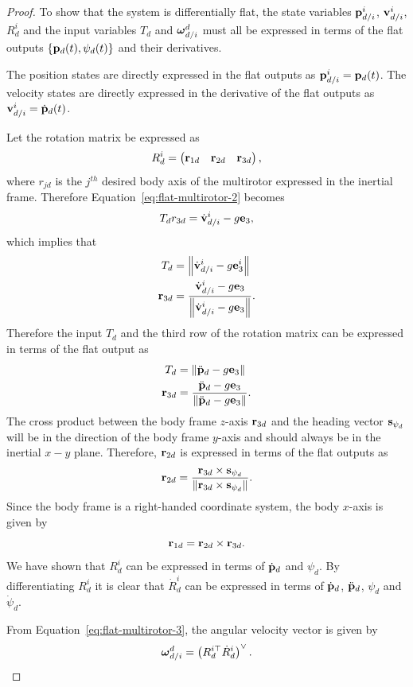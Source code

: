 \begin{proof}
To show that the system is differentially flat, the state variables $\mathbf{p}_{d/i}^i$, $\mathbf{v}_{d/i}^i$, $R_d^i$ and the input variables $T_d$ and $\boldsymbol{\omega}_{d/i}^d$ must all be expressed in terms of the flat outputs $\{\mathbf{p}_d(t), \psi_d(t)\}$ and their derivatives.

The position states are directly expressed in the flat outputs as $\mathbf{p}_{d/i}^i = \mathbf{p}_d(t)$.  The velocity states are directly expressed in the derivative of the flat outputs as $\mathbf{v}_{d/i}^i = \dot{\mathbf{p}}_d(t)$.

Let the rotation matrix be expressed as 
\[
R_d^i = \begin{pmatrix} \mathbf{r}_{1d} & \mathbf{r}_{2d} & \mathbf{r}_{3d} \end{pmatrix},
\]
where $r_{jd}$ is the $j^{th}$ desired body axis of the multirotor expressed in the inertial frame. Therefore Equation~\eqref{eq:flat-multirotor-2} becomes
\[
T_d r_{3d} = \dot{\mathbf{v}}_{d/i}^i - g \mathbf{e}_3,
\]
which implies that 
\begin{align*}
T_d &= \left\|\dot{\mathbf{v}}_{d/i}^i - g \mathbf{e}_3^i\right\| \\
\mathbf{r}_{3d} &= \frac{\dot{\mathbf{v}}_{d/i}^i - g \mathbf{e}_3}{\left\|\dot{\mathbf{v}}_{d/i}^i - g \mathbf{e}_3\right\|}.
\end{align*}
Therefore the input $T_d$ and the third row of the rotation matrix can be expressed in terms of the flat output as
\begin{align*}
T_d &= \left\|\ddot{\mathbf{p}}_d - g \mathbf{e}_3\right\| \\
\mathbf{r}_{3d} &= \frac{\ddot{\mathbf{p}}_d - g \mathbf{e}_3}{\left\|\ddot{\mathbf{p}}_d- g \mathbf{e}_3\right\|}.
\end{align*}
The cross product between the body frame $z$-axis $\mathbf{r}_{3d}$ and the heading vector $\mathbf{s}_{\psi_d}$ will be in the direction of the body frame $y$-axis and should always be in the inertial $x-y$ plane.  Therefore, $\mathbf{r}_{2d}$ is expressed in terms of the flat outputs as
\[
\mathbf{r}_{2d} = \frac{\mathbf{r}_{3d} \times \mathbf{s}_{\psi_d}}{\left\|\mathbf{r}_{3d} \times \mathbf{s}_{\psi_d}\right\|}.
\]
Since the body frame is a right-handed coordinate system, the body $x$-axis is given by
\[
\mathbf{r}_{1d} = \mathbf{r}_{2d} \times \mathbf{r}_{3d}.
\]
We have shown that $R_d^i$ can be expressed in terms of $\dot{\mathbf{p}}_d$ and $\psi_d$.  By differentiating $R_d^i$ it is clear that $\dot{R}_d^i$ can be expressed in terms of $\dot{\mathbf{p}}_d$, $\ddot{\mathbf{p}}_d$, $\psi_d$ and $\dot{\psi}_d$.  

From Equation~\eqref{eq:flat-multirotor-3}, the angular velocity vector is given by
\[
\boldsymbol{\omega}_{d/i}^d = \left(R_d^{i\top} \dot{R}_d^i\right)^\vee. 
\]


\end{proof}

